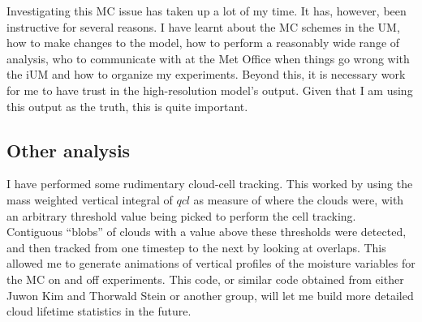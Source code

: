 \documentclass[11pt,a4paper]{article}
\begin{document}
Investigating this MC issue has taken up a lot of my time. It has, however, been instructive for several reasons. I have learnt about the MC schemes in the UM, how to make changes to the model, how to perform a reasonably wide range of analysis, who to communicate with at the Met Office when things go wrong with the iUM and how to organize my experiments. Beyond this, it is necessary work for me to have trust in the high-resolution model's output. Given that I am using this output as the truth, this is quite important. 


\subsection{Other analysis}

I have performed some rudimentary cloud-cell tracking. This worked by using the mass weighted vertical integral of $qcl$ as measure of where the clouds were, with an arbitrary threshold value being picked to perform the cell tracking. Contiguous ``blobs'' of clouds with a value above these thresholds were detected, and then tracked from one timestep to the next by looking at overlaps. This allowed me to generate animations of vertical profiles of the moisture variables for the MC on and off experiments. This code, or similar code obtained from either Juwon Kim and Thorwald Stein or another group, will let me build more detailed cloud lifetime statistics in the future. 

\end{document}
